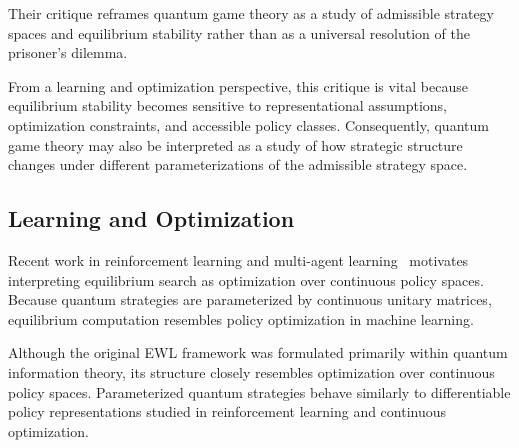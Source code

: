 Their critique reframes quantum game theory as a study of admissible strategy spaces and equilibrium stability rather than as a universal resolution of the prisoner's dilemma.

From a learning and optimization perspective, this critique is vital because equilibrium stability becomes sensitive to representational assumptions, optimization constraints, and accessible policy classes. Consequently, quantum game theory may also be interpreted as a study of how strategic structure changes under different parameterizations of the admissible strategy space.

\subsection{Learning and Optimization}

Recent work in reinforcement learning and multi-agent learning~\cite{sutton,busoniu} motivates interpreting equilibrium search as optimization over continuous policy spaces. Because quantum strategies are parameterized by continuous unitary matrices, equilibrium computation resembles policy optimization in machine learning.

Although the original EWL framework was formulated primarily within quantum information theory, its structure closely resembles optimization over continuous policy spaces. Parameterized quantum strategies behave similarly to differentiable policy representations studied in reinforcement learning and continuous optimization.